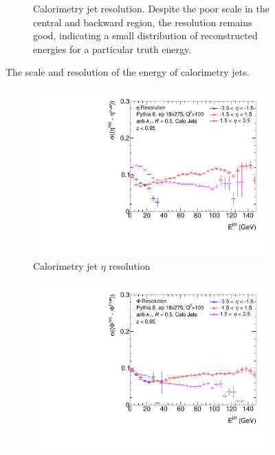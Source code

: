 \begin{figure}
\begin{subfigure}{0.4\textwidth}
        \caption{Calorimetry jet resolution.  Despite the poor scale in the central and backward region, the resolution remains good, indicating a small distribution of reconstructed energies for a particular truth energy.}
        \label{fig:calo_energy_resolution}
    \end{subfigure}
    \caption{The scale and resolution of the energy of calorimetry jets.}
    \label{fig:calo_energy_reso_scale}
\end{figure}



\begin{figure}
    \centering
    \begin{subfigure}{0.4\textwidth}
        \centering
        \includegraphics[width=\linewidth]{figs/Final_Plots/EtaReso_calo_grouped.pdf}
        \caption{Calorimetry jet $\eta$ resolution}
        \label{fig:calo_eta_resolution}
    \end{subfigure}
    \hfill
    \begin{subfigure}{0.4\textwidth}
        \centering
        \includegraphics[width=\linewidth]{figs/Final_Plots/PhiReso_calo_grouped.pdf}

\end{subfigure}
\end{figure}
